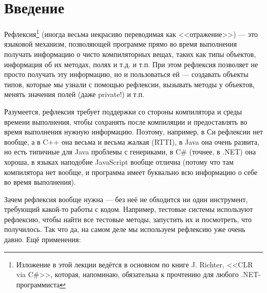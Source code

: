 \documentclass{../../text-style}
\begin{document}
\maketitle
\thispagestyle{empty}

\section*{Введение}

Рефлексия\footnote{Изложение в этой лекции ведётся в основном по книге J. Richter, <<CLR via C\#>>, которая, напоминаю, обязательна к прочтению для любого .NET-программиста} (иногда весьма некрасиво переводимая как <<отражение>>) --- это языковой механизм, позволяющей программе прямо во время выполнения получать информацию о чисто компиляторных вещах, таких как типы объектов, информация об их методах, полях и т.д. и т.п. При этом рефлексия позволяет не просто получать эту информацию, но и пользоваться ей --- создавать объекты типов, которые мы узнали с помощью рефлексии, вызывать методы у объектов, менять значения полей (даже private!) и т.п. 

Разумеется, рефлексия требует поддержки со стороны компилятора и среды времени выполнения, чтобы сохранять после компиляции и предоставлять во время выполнения нужную информацию. Поэтому, например, в Си рефлексии нет вообще, а в C++ она весьма и весьма жалкая (RTTI), в Java она очень развита, но есть типичные для Java проблемы с генериками, в C\# (точнее, в .NET) она хороша, в языках наподобие JavaScript вообще отлична (потому что там компилятора нет вообще, и программа имеет буквально всю информацию о себе во время выполнения).

Зачем рефлексия вообще нужна --- без неё не обходится ни один инструмент, требующий какой-то работы с кодом. Например, тестовые системы используют рефлексию, чтобы найти все тестовые методы, запустить их и посмотреть, что получилось. Так что да, на самом деле мы используем рефлексию уже очень давно. Ещё применения:
\end{document}
